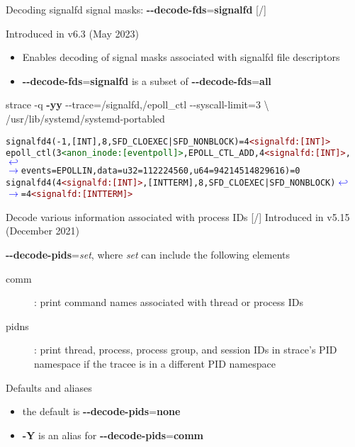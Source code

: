 \documentclass[unicode,aspectratio=169,xcolor={table,dvipsnames,usernames}]{beamer}
\newcommand{\symlinebreak}{\textcolor{blue}{\(\hookleftarrow\)}}
\newcommand{\symlinecont}{\textcolor{blue}{\(\longrightarrow\)}}
\begin{document}
\begin{frame}[fragile]{Decoding signalfd signal masks: \textbf{-{}-decode-fds}=\textbf{signalfd} \hfill [\insertframenumber/\inserttotalframenumber]}
\large
\begin{block}{\large Introduced in v6.3 (May 2023)}
\begin{itemize}
\item Enables decoding of signal masks associated with signalfd file descriptors
\item \textbf{-{}-decode-fds}=\textbf{signalfd} is a subset of \textbf{-{}-decode-fds}=\textbf{all}
\end{itemize}
\end{block}
\begin{block}{\large strace -q \textbf{-yy} -{}-trace=/signalfd,/epoll\_ctl -{}-syscall-limit=3 \textbackslash \\ /usr/lib/systemd/systemd-portabled}
\begin{alltt}
\small
signalfd4(-1, [INT], 8, SFD_CLOEXEC|SFD_NONBLOCK) = 4\textcolor{darkred}{<signalfd:[INT]>}
epoll_ctl(3\textcolor{darkgreen}{<anon_inode:[eventpoll]>}, EPOLL_CTL_ADD, 4\textcolor{darkred}{<signalfd:[INT]>}, \symlinebreak
\symlinecont {events=EPOLLIN, data={u32=112224560, u64=94214514829616}}) = 0
signalfd4(4\textcolor{darkred}{<signalfd:[INT]>}, [INT TERM], 8, SFD_CLOEXEC|SFD_NONBLOCK) \symlinebreak
\symlinecont = 4\textcolor{darkred}{<signalfd:[INT TERM]>}
\end{alltt}
\end{block}
\end{frame}

\begin{frame}{Decode various information associated with process IDs \hfill [\insertframenumber/\inserttotalframenumber]}
\large
Introduced in v5.15 (December 2021)
\begin{block}{\textbf{-{}-decode-pids}=\textit{set}, where \textit{set} can include the following elements}
\begin{description}
	\item[comm]: print command names associated with thread or process IDs
	\item[pidns]: print thread, process, process group, and session IDs
		in strace's PID namespace if the tracee is in a different PID namespace
\end{description}
\end{block}

\begin{block}{Defaults and aliases}
\begin{itemize}
\item the default is \textbf{-{}-decode-pids}=\textbf{none}
\item \textbf{-Y} is an alias for \textbf{-{}-decode-pids}=\textbf{comm}
\end{itemize}
\end{block}
\end{frame}
\end{document}
